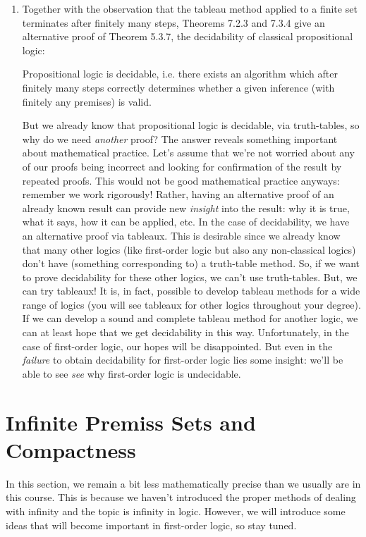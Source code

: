 \begin{enumerate}[\thesection.1]
	\item Together with the observation that the tableau method applied to a finite set terminates after finitely many steps, Theorems 7.2.3 and 7.3.4 give an alternative proof of Theorem 5.3.7, the decidability of classical propositional logic:
	\begin{theorem}
	Propositional logic is decidable, i.e. there exists an algorithm which after finitely many steps correctly determines whether a given inference (with finitely any premises) is valid.
	\end{theorem}
	But we already know that propositional logic is decidable, via truth-tables, so why do we need \emph{another} proof? The answer reveals something important about mathematical practice. Let's assume that we're not worried about any of our proofs being incorrect and looking for confirmation of the result by repeated proofs. This would not be good mathematical practice anyways: remember we work rigorously! Rather, having an alternative proof of an already known result can provide new \emph{insight} into the result: why it is true, what it says, how it can be applied, etc. In the case of decidability, we have an alternative proof via tableaux. This is desirable since we already know that many other logics (like first-order logic but also any non-classical logics) don't have (something corresponding to) a truth-table method. So, if we want to prove decidability for these other logics, we can't use truth-tables. But, we can try tableaux! It is, in fact, possible to develop tableau methods for a wide range of logics (you will see tableaux for other logics throughout your degree). If we can develop a sound and complete tableau method for another logic, we can at least hope that we get decidability in this way. Unfortunately, in the case of first-order logic, our hopes will be disappointed. But even in the \emph{failure} to obtain decidability for first-order logic lies some insight: we'll be able to see \emph{see} why first-order logic is undecidable.		
	
\end{enumerate}
		
\section{Infinite Premiss Sets and Compactness}

\begin{em}
  In this section, we remain a bit less mathematically precise than we usually are in this course.
  This is because we haven't introduced the proper methods of dealing with infinity and the topic is infinity in logic.
  However, we will introduce some ideas that will become important in first-order logic, so stay tuned.
\end{em}

